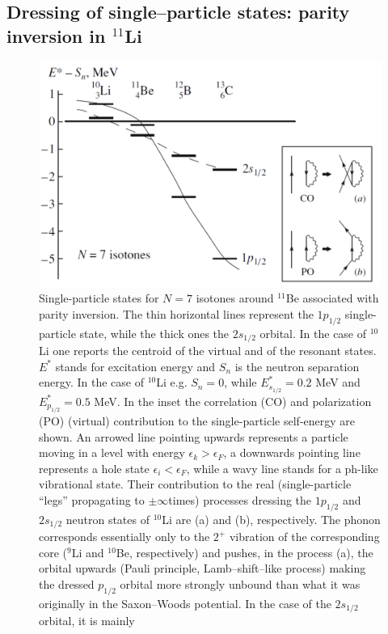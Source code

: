 \subsection{Dressing of single--particle states: parity inversion in $^{11}$Li}\label{C6S2.2x}
 \begin{figure}
 \centerline{\includegraphics*[width=12 cm,angle=0]{C6/figs_C6/fig6_2_4.pdf}}
\caption{Single-particle states for $N = 7$ isotones around $^{11}$Be associated with parity inversion. The thin horizontal lines
represent the $1p_{1/2}$ single-particle state, while the thick ones the $2s_{1/2}$ orbital. In the case of $^{10}$Li one reports the centroid of
the virtual and of the resonant states. $E^*$ stands for excitation energy and $S_n$ is the neutron separation energy. In the case
of $^{10}$Li e.g. $S_n = 0$, while $E^*_{s_{1/2}} = 0.2$ MeV and $E^*_{p_{1/2}} = 0.5$ MeV. In the inset the correlation (CO) and polarization (PO)
(virtual) contribution to the single-particle self-energy are shown. An arrowed line pointing upwards represents a particle
moving in a level with energy $\epsilon_k > \epsilon_F$, a downwards pointing line represents a hole state $\epsilon_i < \epsilon_F$, while a wavy line stands for
a ph-like vibrational state. Their contribution to the real (single-particle ``legs'' propagating to $\pm\infty$times) processes dressing
the $1p_{1/2}$ and $2s_{1/2}$ neutron states of $^{10}$Li  are (a) and (b), respectively.  The phonon corresponds
essentially only to the $2^+$ vibration of the corresponding core ($^9$Li and $^{10}$Be, respectively) and pushes, in the process (a), the orbital upwards
(Pauli principle, Lamb--shift--like process) making the dressed $p_{1/2}$ orbital more strongly unbound than what it was originally
in the Saxon–Woods potential. In the case of the $2s_{1/2}$ orbital, it is mainly
}
\end{figure}
